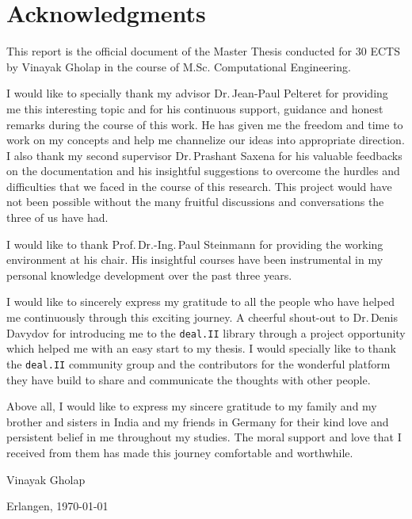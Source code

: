\chapter*{Acknowledgments}
\indent This report is the official document of the Master Thesis conducted for 30 ECTS by Vinayak Gholap in the course of M.Sc. Computational Engineering. \par
I would like to specially thank my advisor Dr.\,Jean-Paul Pelteret for providing me this interesting topic and for his continuous support, guidance and honest remarks during the course of this work. He has given me the freedom and time to work on my concepts and help me channelize our ideas into appropriate direction. I also thank my second supervisor Dr.\,Prashant Saxena for his valuable feedbacks on the documentation and his insightful suggestions to overcome the hurdles and difficulties that we faced in the course of this research. This project would have not been possible without the many fruitful discussions and conversations the three of us have had. \par  
I would like to thank Prof.\,Dr.-Ing.\,Paul Steinmann for providing the working environment at his chair. His insightful courses have been instrumental in my personal knowledge development over the past three years. \par 
I would like to sincerely express my gratitude to all the people who have helped me continuously through this exciting journey. A cheerful shout-out to Dr.\,Denis Davydov for introducing me to the \texttt{deal.II} library through a project opportunity which helped me with an easy start to my thesis. I would specially like to thank the \texttt{deal.II} community group and the contributors for the wonderful platform they have build to share and communicate the thoughts with other people. \par 
Above all, I would like to express my sincere gratitude to my family and my brother and sisters in India and my friends in Germany for their kind love and persistent belief in me throughout my studies. The moral support and love that I received from them has made this journey comfortable and worthwhile. \newline\par 

\noindent Vinayak Gholap \par 
\noindent Erlangen, \today
